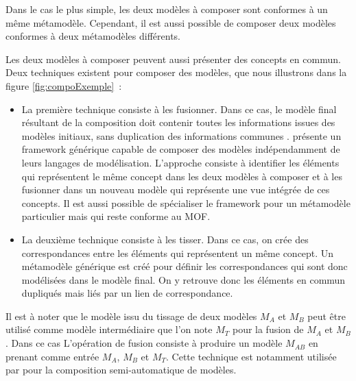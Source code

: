 \begin{description}
Dans le cas le plus simple, les deux modèles à composer sont conformes à un même 
métamodèle. Cependant, il est aussi possible de composer deux modèles conformes 
à deux métamodèles différents. 

Les deux modèles à composer peuvent aussi présenter des concepts en commun. Deux 
techniques existent pour composer des modèles, que nous illustrons dans la 
figure \ref{fig:compoExemple}~:

\begin{itemize}
\item La première technique consiste à les fusionner. Dans ce cas, le modèle 
final résultant de la composition doit contenir toutes les informations issues 
des modèles initiaux, sans duplication des informations communes 
\cite{bezivin2006canonical}.
\cite{fleurey2008generic} présente un framework générique capable de composer 
des modèles indépendamment de leurs langages de modélisation. L'approche 
consiste à identifier les éléments qui représentent le même concept dans les 
deux modèles à composer et à les fusionner dans un nouveau modèle qui représente 
une vue intégrée de ces concepts. Il est aussi possible de spécialiser le 
framework pour un métamodèle particulier mais qui reste conforme au MOF.

\item La deuxième technique consiste à les tisser. Dans ce cas, on crée des 
correspondances entre les éléments qui représentent un même concept. Un 
métamodèle générique est créé pour définir les correspondances qui sont donc 
modélisées dans le modèle final. On y retrouve donc les éléments en commun 
dupliqués mais liés par un lien de correspondance. 
\end{itemize}

Il est à noter que le modèle issu du tissage de deux modèles $M_{A}$ et $M_{B}$ 
peut être utilisé comme modèle intermédiaire que l'on note $M_{T}$ pour la 
fusion de $M_{A}$ et $M_{B}$. Dans ce cas L'opération de fusion consiste à 
produire un modèle $M_{AB}$ en prenant comme entrée $M_{A}$, $M_{B}$ et $M_{T}$. 
Cette technique est notamment utilisée par \cite{del2007semi} pour la 
composition semi-automatique de modèles.


\end{description}
